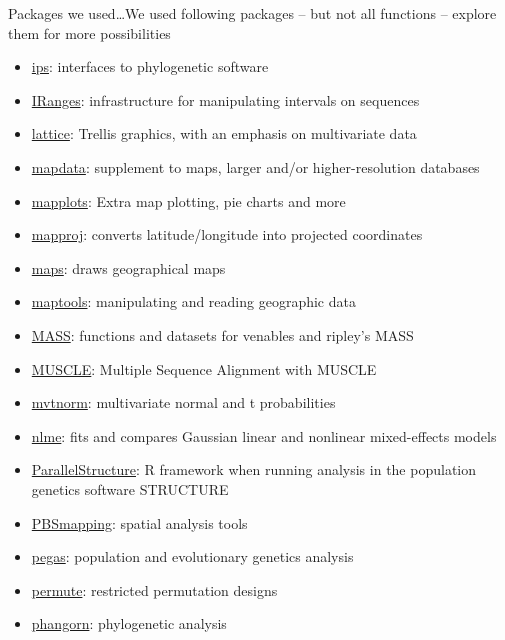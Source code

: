 \documentclass[compress, ucs, xelatex, 11pt, xcolor=svgnames,
  hyperref={
    bookmarks=true,
    unicode=true,
    colorlinks=true,
    pdftitle={Molecular data in R},
    plainpages=false,
    pdfauthor={Vojtech Zeisek},
    pdfsubject={Course about phylogeny and evolution in R},
    pdfcreator={XeLaTeX},
    pdfkeywords={R, evolution, phylogeny, molecular data},
    linkcolor=Tomato,
    anchorcolor=SaddleBrown,
    citecolor=Goldenrod,
    filecolor=DarkMagenta,
    menucolor=Sienna,
    urlcolor=DarkTurquoise,
    pdftex},
  url={hyphens, lowtilde} %
  ]{beamer}
\begin{document}
\begin{frame}[allowframebreaks]{Packages we used\ldots}{We used following packages -- but not all functions -- explore them for more possibilities}
\begin{itemize}
    \item \href{https://CRAN.R-project.org/package=ips}{ips}: interfaces to phylogenetic software
    \item \href{https://www.bioconductor.org/packages/3.4/bioc/html/IRanges.html}{IRanges}: infrastructure for manipulating intervals on sequences
    \item \href{https://CRAN.R-project.org/package=lattice}{lattice}: Trellis graphics, with an emphasis on multivariate data
    \item \href{https://CRAN.R-project.org/package=mapdata}{mapdata}: supplement to maps, larger and/or higher-resolution databases
    \item \href{https://CRAN.R-project.org/package=mapplots}{mapplots}: Extra map plotting, pie charts and more
    \item \href{https://CRAN.R-project.org/package=mapproj}{mapproj}: converts latitude/longitude into projected coordinates
    \item \href{https://CRAN.R-project.org/package=maps}{maps}: draws geographical maps
    \item \href{https://CRAN.R-project.org/package=maptools}{maptools}: manipulating and reading geographic data
    \item \href{https://CRAN.R-project.org/package=MASS}{MASS}: functions and datasets for venables and ripley's MASS
    \item \href{https://www.bioconductor.org/packages/3.4/bioc/html/muscle.html}{MUSCLE}: Multiple Sequence Alignment with MUSCLE
    \item \href{https://CRAN.R-project.org/package=mvtnorm}{mvtnorm}: multivariate normal and t probabilities
    \item \href{https://CRAN.R-project.org/package=nlme}{nlme}: fits and compares Gaussian linear and nonlinear mixed-effects models
    \item \href{https://r-forge.r-project.org/projects/parallstructure/}{ParallelStructure}: R framework when running analysis in the population genetics software STRUCTURE
    \item \href{https://CRAN.R-project.org/package=PBSmapping}{PBSmapping}: spatial analysis tools
    \item \href{https://CRAN.R-project.org/package=pegas}{pegas}: population and evolutionary genetics analysis
    \item \href{https://CRAN.R-project.org/package=permute}{permute}: restricted permutation designs
    \item \href{https://CRAN.R-project.org/package=phangorn}{phangorn}: phylogenetic analysis

\end{itemize}
\end{frame}
\end{document}
